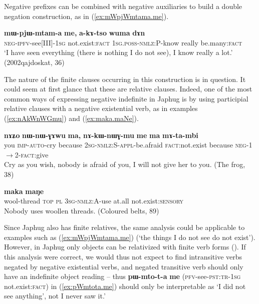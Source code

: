 \documentclass[oneside,a4paper,11pt]{article}
\newcommand{\ipa}[1]{\textbf{\phon#1}} %
\newcommand{\refb}[1]{(\ref{#1})}
\begin{document}
Negative prefixes can be combined with negative auxiliaries to build a double negation construction, as in \refb{ex:mWpjWmtama.me}. 
 \begin{exe}
\ex \label{ex:mWpjWmtama.me}
\gll 
  \ipa{mɯ-pjɯ-mtam-a} 	\ipa{me,} 	\ipa{a-kɤ-tso} 	\ipa{wuma} 	\ipa{dɤn} \\
  \textsc{neg-ipfv}-see[III]-\textsc{1sg} not.exist:\textsc{fact} \textsc{1sg.poss-nmlz}:P-know really be.many:\textsc{fact} \\
\glt `I have seen everything (there is nothing I do not see), I know really a lot.' (2002qajdoskat, 36)
\end{exe} 

The nature of the finite clauses occurring in this construction is in question. It could seem at first glance that these are relative clauses. Indeed, one of the most common ways of expressing negative indefinite in Japhug is by using participial relative clauses with a negative existential verb, as in examples \refb{ex:nAkWnWGmu} and \refb{ex:maka.maNe}.

\begin{exe}
   \ex  \label{ex:nAkWnWGmu}
\gll   
\ipa{nɤʑo}  	\ipa{nɯ-nɯ-ɣɤwu}  	\ipa{ma,}  	\ipa{nɤ-kɯ-nɯɣ-mu}  	\ipa{me}  	\ipa{ma}  	\ipa{mɤ-ta-mbi}  \\
you \textsc{imp-auto}-cry because \textsc{2sg-nmlz:S-appl}-be.afraid \textsc{fact}:not.exist because \textsc{neg-1$\rightarrow$2-fact}:give \\
\glt Cry as you wish, nobody is afraid of you, I will not give her to you.  (The frog, 38)
\end{exe}

\begin{exe}
   \ex  \label{ex:maka.maNe}
\gll   
[\ipa{smɤɣ-ri}  	\ipa{nɯ}  	\ipa{ra}  	\ipa{ɯ-kɯ-ntɕhoz}]  	\ipa{maka}  	\ipa{maŋe}   \\
wool-thread \textsc{top} \textsc{pl} \textsc{3sg-nmlz:A}-use at.all not.exist:\textsc{sensory}  \\
\glt Nobody uses woollen threads. (Coloured belts, 89)
\end{exe}

Since Japhug also has finite relatives, the same analysis could be applicable to examples such as \refb{ex:mWpjWmtama.me} (`the things I do not see do not exist').  However, in Japhug only objects can be relativized with finite verb forms (\citealt[12-3]{jacques16relatives}). If this analysis were correct, we would thus not expect to find intransitive verbs negated  by negative existential verbs, and negated transitive verb should only have an indefinite object reading -- thus \ipa{pɯ-mto-t-a}  \ipa{me} (\textsc{pfv}-see-\textsc{pst:tr-1sg} not.exist:\textsc{fact})
in \refb{ex:pWmtota.me} should only be interpretable as `I did not see anything', not  I never saw it.'
\end{document}
